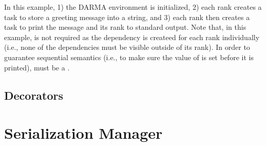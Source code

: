 In this example, 1) the DARMA environment is initialized, 2) each rank creates a
task to store a greeting message into a string, and 3) each rank then creates a
task to print the message and its rank to standard output.
Note that, in this example,  is not required as the
dependency  is createed for each rank individually
(i.e., none of the dependencies must be visible outside of its rank).
In order to guarantee \gls{sequential semantics} (i.e., to make sure the value
of  is set before it is printed),
 must be a .


\subsection{Decorators}
\label{subsec:decorators}


\section{Serialization Manager}
